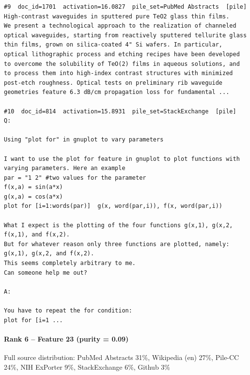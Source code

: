 \begin{verbatim}
#9  doc_id=1701  activation=16.0827  pile_set=PubMed Abstracts  [pile]
High-contrast waveguides in sputtered pure TeO2 glass thin films.
We present a technological approach to the realization of channeled optical waveguides, starting from reactively sputtered tellurite glass thin films, grown on silica-coated 4" Si wafers. In particular, optical lithographic process and etching recipes have been developed to overcome the solubility of TeO(2) films in aqueous solutions, and to process them into high-index contrast structures with minimized post-etch roughness. Optical tests on preliminary rib waveguide geometries feature 6.3 dB/cm propagation loss for fundamental ...

#10  doc_id=814  activation=15.8931  pile_set=StackExchange  [pile]
Q:

Using "plot for" in gnuplot to vary parameters

I want to use the plot for feature in gnuplot to plot functions with varying parameters. Here an example
par = "1 2" #two values for the parameter
f(x,a) = sin(a*x)
g(x,a) = cos(a*x)
plot for [i=1:words(par)]  g(x, word(par,i)), f(x, word(par,i))

What I expect is the plotting of the four functions g(x,1), g(x,2, f(x,1), and f(x,2).
But for whatever reason only three functions are plotted, namely: g(x,1), g(x,2, and f(x,2).
This seems completely arbitrary to me.
Can someone help me out?

A:

You have to repeat the for condition:
plot for [i=1 ...

\end{verbatim}

\paragraph*{Rank 6 -- Feature 23 (purity = 0.09)}

Full source distribution: PubMed Abstracts 31\%, Wikipedia (en) 27\%, Pile-CC 24\%, NIH ExPorter 9\%, StackExchange 6\%, Github 3\%

